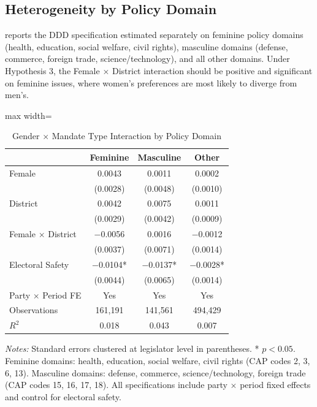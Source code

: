 \documentclass[12pt]{article}
\begin{document}
\subsection{Heterogeneity by Policy Domain}

 reports the DDD specification estimated separately on feminine policy domains (health, education, social welfare, civil rights), masculine domains (defense, commerce, foreign trade, science/technology), and all other domains. Under Hypothesis 3, the Female $\times$ District interaction should be positive and significant on feminine issues, where women's preferences are most likely to diverge from men's.

\begin{table}[htbp]
\centering
\caption{Gender $\times$ Mandate Type Interaction by Policy Domain}
\label{tab:policy}
\begin{adjustbox}{max width=\textwidth}
\begin{tabular}{lccc}
\toprule
& Feminine & Masculine & Other \\
\midrule
Female & 0.0043 & 0.0011 & 0.0002 \\
& (0.0028) & (0.0048) & (0.0010) \\
District & 0.0042 & 0.0075 & 0.0011 \\
& (0.0029) & (0.0042) & (0.0009) \\
Female $\times$ District & $-$0.0056 & 0.0016 & $-$0.0012 \\
& (0.0037) & (0.0071) & (0.0014) \\
Electoral Safety & $-$0.0104* & $-$0.0137* & $-$0.0028* \\
& (0.0044) & (0.0065) & (0.0014) \\
\midrule
Party $\times$ Period FE & Yes & Yes & Yes \\
Observations & 161,191 & 141,561 & 494,429 \\
$R^2$ & 0.018 & 0.043 & 0.007 \\
\bottomrule
\end{tabular}
\end{adjustbox}
\begin{minipage}{0.95\textwidth}
\vspace{0.5em}
\footnotesize
\textit{Notes:} Standard errors clustered at legislator level in parentheses. * $p<0.05$. Feminine domains: health, education, social welfare, civil rights (CAP codes 2, 3, 6, 13). Masculine domains: defense, commerce, science/technology, foreign trade (CAP codes 15, 16, 17, 18). All specifications include party $\times$ period fixed effects and control for electoral safety.
\end{minipage}
\end{table}
\end{document}

